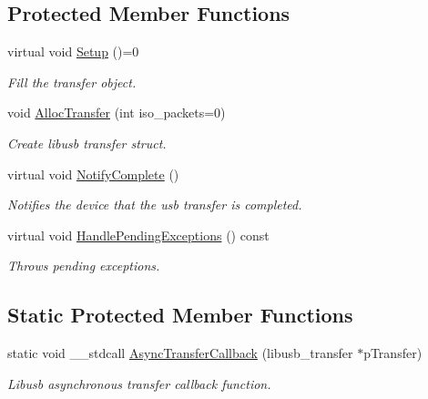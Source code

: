 \subsection*{Protected Member Functions}
\begin{DoxyCompactItemize}
\item 
\hypertarget{class_lib_u_s_b_1_1_transfer_impl_a9c6e59de55a7059694c10b66f9a7f5ca}{virtual void \hyperlink{class_lib_u_s_b_1_1_transfer_impl_a9c6e59de55a7059694c10b66f9a7f5ca}{Setup} ()=0}\label{class_lib_u_s_b_1_1_transfer_impl_a9c6e59de55a7059694c10b66f9a7f5ca}

\begin{DoxyCompactList}\small\item\em Fill the transfer object. \end{DoxyCompactList}\item 
\hypertarget{class_lib_u_s_b_1_1_transfer_impl_a2d3308de62990fa94de3298fd76e890b}{void \hyperlink{class_lib_u_s_b_1_1_transfer_impl_a2d3308de62990fa94de3298fd76e890b}{Alloc\-Transfer} (int iso\-\_\-packets=0)}\label{class_lib_u_s_b_1_1_transfer_impl_a2d3308de62990fa94de3298fd76e890b}

\begin{DoxyCompactList}\small\item\em Create libusb transfer struct. \end{DoxyCompactList}\item 
\hypertarget{class_lib_u_s_b_1_1_transfer_impl_ab79c5240da3b56fef940148ac8b5742f}{virtual void \hyperlink{class_lib_u_s_b_1_1_transfer_impl_ab79c5240da3b56fef940148ac8b5742f}{Notify\-Complete} ()}\label{class_lib_u_s_b_1_1_transfer_impl_ab79c5240da3b56fef940148ac8b5742f}

\begin{DoxyCompactList}\small\item\em Notifies the device that the usb transfer is completed. \end{DoxyCompactList}\item 
virtual void \hyperlink{class_lib_u_s_b_1_1_transfer_impl_a33ba7d60252435c304c56a82eb3d4680}{Handle\-Pending\-Exceptions} () const 
\begin{DoxyCompactList}\small\item\em Throws pending exceptions. \end{DoxyCompactList}\end{DoxyCompactItemize}
\subsection*{Static Protected Member Functions}
\begin{DoxyCompactItemize}
\item 
static void \-\_\-\-\_\-stdcall \hyperlink{class_lib_u_s_b_1_1_transfer_impl_a7b64266d16c9d13679af8ede2e230e68}{Async\-Transfer\-Callback} (libusb\-\_\-transfer $\ast$p\-Transfer)
\begin{DoxyCompactList}\small\item\em Libusb asynchronous transfer callback function. \end{DoxyCompactList}\end{DoxyCompactItemize}
